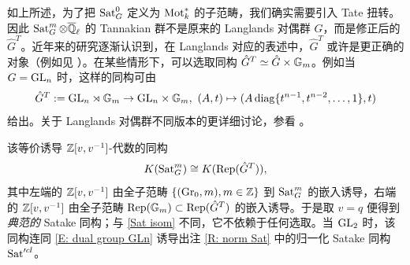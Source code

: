 \begin{rmk}
\label{R:Tate twist}

如上所述，为了把 $\operatorname{Sat}_G^0$ 定义为 $\operatorname{Mot}^*_k$ 的子范畴，我们确实需要引入 Tate 扭转。因此 $\operatorname{Sat}_G^m\otimes{\overline{{\mathbb Q}}_\ell}$ 的 Tannakian 群不是原来的 Langlands 对偶群 $\hat{G}$，而是修正后的 $\hat G^T$。近年来的研究逐渐认识到，在 Langlands 对应的表述中，$\hat G^T$ 或许是更正确的对象（例如见 \cite{BG}）。在某些情形下，可以选取同构 $\hat{G}^T\simeq \hat{G}\times {\mathbb G}_m$。例如当 $G={\operatorname{GL}}_n$ 时，这样的同构可由
\begin{equation}
\label{E: dual group GLn}
\hat{G}^T:={\operatorname{GL}}_n\rtimes{\mathbb G}_m\to {\operatorname{GL}}_n\times {\mathbb G}_m,\ (A,t)\mapsto (A\operatorname{diag}\{t^{n-1},t^{n-2},\ldots,1\}, t)
\end{equation}
给出。关于 Langlands 对偶群不同版本的更详细讨论，参看 \cite[\S 5.5]{Zh2}。

该等价诱导 ${\mathbb Z}[v,v^{-1}]$-代数的同构
$$K(\operatorname{Sat}^m_G)\cong K(\operatorname{Rep}(\hat{G}^T)),$$
其中左端的 ${\mathbb Z}[v,v^{-1}]$ 由全子范畴 $\{({\operatorname{Gr}}_0,m), m\in{\mathbb Z}\}$ 到 $\operatorname{Sat}_G^m$ 的嵌入诱导，右端的 ${\mathbb Z}[v,v^{-1}]$ 由全子范畴 $\operatorname{Rep}({\mathbb G}_m)\subset \operatorname{Rep}(\hat G^T)$ 的嵌入诱导。于是取 $v=q$ 便得到\emph{典范的} Satake 同构；与 \eqref{Sat isom} 不同，它不依赖于任何选取。当 ${\operatorname{GL}}_2$ 时，该同构连同 \eqref{E: dual group GLn} 诱导出注 \ref{R: norm Sat} 中的归一化 Satake 同构 $\operatorname{Sat}'^{cl}$。
\end{rmk}

